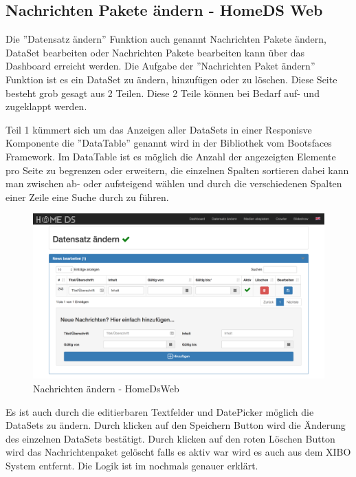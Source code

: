 \subsection{Nachrichten Pakete ändern - HomeDS Web}\label{sec:homedswebdataset}
Die ''Datensatz ändern'' Funktion auch genannt Nachrichten Pakete ändern, DataSet bearbeiten oder Nachrichten Pakete bearbeiten kann über das Dashboard erreicht werden.
Die Aufgabe der ''Nachrichten Paket ändern'' Funktion ist es ein DataSet zu ändern, hinzufügen oder zu löschen. Diese Seite besteht grob gesagt aus 2 Teilen. Diese 2 Teile können bei Bedarf auf- und zugeklappt werden.

Teil 1 kümmert sich um das Anzeigen aller DataSets in einer Responisve Komponente die ''DataTable'' genannt wird in der Bibliothek vom Bootsfaces Framework. Im DataTable ist es möglich die Anzahl der angezeigten Elemente pro Seite zu begrenzen oder erweitern,  die einzelnen Spalten sortieren dabei kann man zwischen ab- oder aufsteigend wählen und durch die verschiedenen Spalten einer Zeile eine Suche durch zu führen. 


\begin{figure}[H]
\centering
\includegraphics[width=1\textwidth]{images/08_HomeDsWeb/NachrichtenPaket.png}
\caption{Nachrichten ändern - HomeDsWeb}
\label{img:changenews}
\end{figure}


Es ist auch durch die editierbaren Textfelder und DatePicker möglich die DataSets zu ändern. Durch klicken auf den Speichern Button wird die Änderung des einzelnen DataSets bestätigt. Durch klicken auf den roten Löschen Button wird das Nachrichtenpaket gelöscht falls es aktiv war wird es auch aus dem XIBO System entfernt. Die Logik ist im \pageref{sec:datasetexpiredate} nochmals genauer erklärt. 

